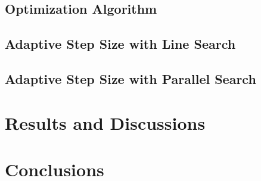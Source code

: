 \begin{figure}
\begin{minipage}{.25\textwidth}
	\caption{}
	\label{fig:tf_nucleon_naive}	
	\end{minipage}
\end{figure}



\subsection{Optimization Algorithm}


\subsection{Adaptive Step Size with Line Search}


\subsection{Adaptive Step Size with Parallel Search}

\section{Results and Discussions}

\section{Conclusions}
